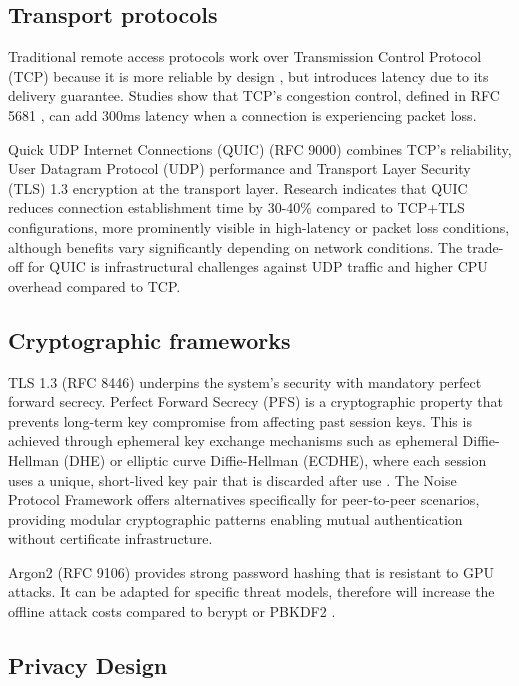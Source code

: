 \documentclass[12pt,a4paper]{article}
\begin{document}
\subsection{Transport protocols}

Traditional remote access protocols work over Transmission Control Protocol (TCP) because it is more reliable by design \cite{RFC793}, but introduces latency due to its delivery guarantee. Studies show that TCP's congestion control, defined in RFC 5681 \cite{RFC5681}, can add 300ms latency when a connection is experiencing packet loss.

Quick UDP Internet Connections (QUIC) (RFC 9000) \cite{IETF9000} combines TCP's reliability, User Datagram Protocol (UDP) performance and Transport Layer Security (TLS) 1.3 \cite{Res18} encryption at the transport layer. Research \cite{IETF9000} indicates that QUIC reduces connection establishment time by 30-40\% compared to TCP+TLS configurations, more prominently visible in high-latency or packet loss conditions, although benefits vary significantly depending on network conditions. The trade-off for QUIC is infrastructural challenges against UDP traffic and higher CPU overhead compared to TCP.

\subsection{Cryptographic frameworks}

TLS 1.3 (RFC 8446) \cite{Res18} underpins the system's security with mandatory perfect forward secrecy. Perfect Forward Secrecy (PFS) is a cryptographic property that prevents long-term key compromise from affecting past session keys. This is achieved through ephemeral key exchange mechanisms such as ephemeral Diffie-Hellman (DHE) or elliptic curve Diffie-Hellman (ECDHE), where each session uses a unique, short-lived key pair that is discarded after use \cite{NIST_SP80052}. The Noise Protocol Framework \cite{Noise18} offers alternatives specifically for peer-to-peer scenarios, providing modular cryptographic patterns enabling mutual authentication without certificate infrastructure.

Argon2 (RFC 9106) \cite{BDK21} provides strong password hashing that is resistant to GPU attacks. It can be adapted for specific threat models, therefore will increase the offline attack costs compared to bcrypt \cite{Buch24} or PBKDF2 \cite{Team23}.

\subsection{Privacy Design}
\end{document}
